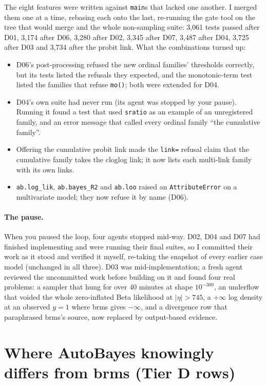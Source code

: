 \documentclass[11pt]{article}
\newcommand{\code}[1]{\texttt{#1}}
\begin{document}
The eight features were written against \code{main}s that lacked one another. I merged them one at a time, rebasing each
onto the last, re-running the gate tool on the tree that would merge and the whole non-sampling suite: 3{,}061 tests
passed after D01, 3{,}174 after D06, 3{,}280 after D02, 3{,}345 after D07, 3{,}487 after D04, 3{,}725 after D03 and 3{,}734
after the probit link. What the combinations turned up:
\begin{itemize}
\item D06's post-processing refused the new ordinal families' thresholds correctly, but its tests listed the refusals
  they expected, and the monotonic-term test listed the families that refuse \code{mo()}; both were extended for D04.
\item D04's own suite had never run (its agent was stopped by your pause). Running it found a test that used
  \code{sratio} as an example of an unregistered family, and an error message that called every ordinal family
  ``the cumulative family''.
\item Offering the cumulative probit link made the \code{link=} refusal claim that the cumulative family takes the
  cloglog link; it now lists each multi-link family with its own links.
\item \code{ab.log\_lik}, \code{ab.bayes\_R2} and \code{ab.loo} raised an \code{AttributeError} on a multivariate model;
  they now refuse it by name (D06).
\end{itemize}

\paragraph{The pause.} When you paused the loop, four agents stopped mid-way. D02, D04 and D07 had finished implementing
and were running their final suites, so I committed their work as it stood and verified it myself, re-taking the
snapshot of every earlier case model (unchanged in all three). D03 was mid-implementation; a fresh agent reviewed the
uncommitted work before building on it and found four real problems: a sampler that hung for over 40 minutes at
shape $10^{-300}$, an underflow that voided the whole zero-inflated Beta likelihood at $|\eta| > 745$, a $+\infty$ log
density at an observed $y = 1$ where brms gives $-\infty$, and a divergence row that paraphrased brms's source, now
replaced by output-based evidence.

\section{Where AutoBayes knowingly differs from brms (Tier D rows)}
\label{sec:divergences}
\end{document}
